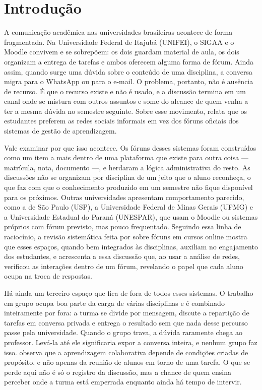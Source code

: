 \section{Introdução}
\label{introducao}

A comunicação acadêmica nas universidades brasileiras acontece de forma fragmentada. Na Universidade Federal de Itajubá (UNIFEI), o SIGAA e o Moodle convivem e se sobrepõem: os dois guardam material de aula, os dois organizam a entrega de tarefas e ambos oferecem alguma forma de fórum. Ainda assim, quando surge uma dúvida sobre o conteúdo de uma disciplina, a conversa migra para o WhatsApp ou para o e-mail. O problema, portanto, não é ausência de recurso. É que o recurso existe e não é usado, e a discussão termina em um canal onde se mistura com outros assuntos e some do alcance de quem venha a ter a mesma dúvida no semestre seguinte. Sobre esse movimento, \cite{kent2013} relata que os estudantes preferem as redes sociais informais em vez dos fóruns oficiais dos sistemas de gestão de aprendizagem.

Vale examinar por que isso acontece. Os fóruns desses sistemas foram construídos como um item a mais dentro de uma plataforma que existe para outra coisa — matrícula, nota, documento —, e herdaram a lógica administrativa do resto. As discussões não se organizam por disciplina de um jeito que o aluno reconheça, o que faz com que o conhecimento produzido em um semestre não fique disponível para os próximos. Outras universidades apresentam comportamento parecido, como a de São Paulo (USP), a Universidade Federal de Minas Gerais (UFMG) e a Universidade Estadual do Paraná (UNESPAR), que usam o Moodle ou sistemas próprios com fórum previsto, mas pouco frequentado. Seguindo essa linha de raciocínio, a revisão sistemática feita por \cite{almatrafi2019} sobre fóruns em cursos online mostra que esses espaços, quando bem integrados às disciplinas, auxiliam no engajamento dos estudantes, e \cite{kumi2023} acrescenta a essa discussão que, ao usar a análise de redes, verificou as interações dentro de um fórum, revelando o papel que cada aluno ocupa na troca de respostas.

Há ainda um terceiro espaço que fica de fora de todos esses sistemas. O trabalho em grupo ocupa boa parte da carga de várias disciplinas e é combinado inteiramente por fora: a turma se divide por mensagem, discute a repartição de tarefas em conversa privada e entrega o resultado sem que nada desse percurso passe pela universidade. Quando o grupo trava, a dúvida raramente chega ao professor. Levá-la até ele significaria expor a conversa inteira, e nenhum grupo faz isso. \cite{scager2016} observa que a aprendizagem colaborativa depende de condições criadas de propósito, e não apenas da reunião de alunos em torno de uma tarefa. O que se perde aqui não é só o registro da discussão, mas a chance de quem ensina perceber onde a turma está emperrada enquanto ainda há tempo de intervir.


